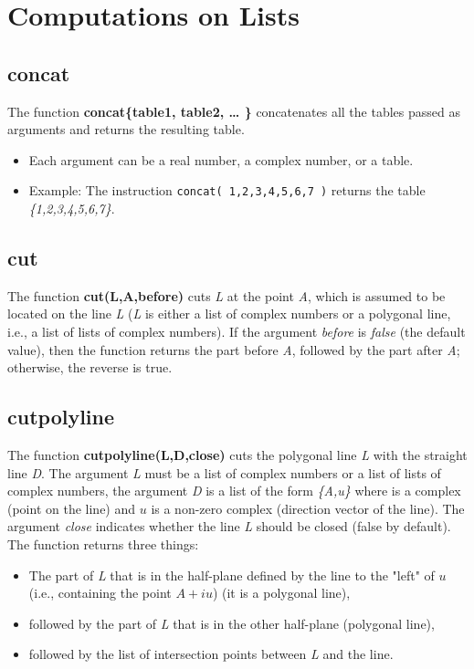 \section{Computations on Lists}

\subsection{concat}
The function \textbf{concat\{table1, table2, \ldots{} \}} concatenates all the tables passed as arguments and returns the resulting table.

\begin{itemize}
    \item Each argument can be a real number, a complex number, or a table.
    \item Example: The instruction \texttt{concat( 1,2,3,{4,5,6},7 )} returns the table \emph{\{1,2,3,4,5,6,7\}}.
\end{itemize}

\subsection{cut}
The function \textbf{cut(L,A,before)} cuts \emph{L} at the point \emph{A}, which is assumed to be located on the line \emph{L} (\emph{L} is either a list of complex numbers or a polygonal line, i.e., a list of lists of complex numbers). If the argument \emph{before} is \emph{false} (the default value), then the function returns the part before \emph{A}, followed by the part after \emph{A}; otherwise, the reverse is true.

\subsection{cutpolyline}
The function \textbf{cutpolyline(L,D,close)} cuts the polygonal line \emph{L} with the straight line \emph{D}. The argument \emph{L} must be a list of complex numbers or a list of lists of complex numbers, the argument \emph{D} is a list of the form \emph{\{A,u\}} where is a complex (point on the line) and $u$ is a non-zero complex (direction vector of the line). The argument \emph{close} indicates whether the line \emph{L} should be closed (false by default). The function returns three things:
\begin{itemize}
    \item The part of \emph{L} that is in the half-plane defined by the line to the "left" of $u$ (i.e., containing the point $A+iu$) (it is a polygonal line),
    \item followed by the part of \emph{L} that is in the other half-plane (polygonal line),
    \item followed by the list of intersection points between \emph{L} and the line. \end{itemize}

